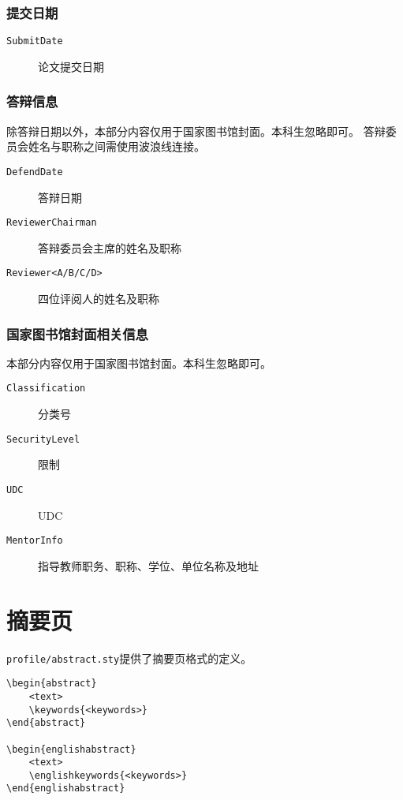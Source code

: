 \subsubsection{提交日期}
\begin{description}
    \item[\texttt{SubmitDate}] 论文提交日期
\end{description}

\subsubsection{答辩信息}

除答辩日期以外，本部分内容仅用于国家图书馆封面。本科生忽略即可。
答辩委员会姓名与职称之间需使用波浪线连接。

\begin{description}
    \item[\texttt{DefendDate}] 答辩日期
    \item[\texttt{ReviewerChairman}] 答辩委员会主席的姓名及职称 
    \item[\texttt{Reviewer<A/B/C/D>}] 四位评阅人的姓名及职称  
\end{description}

\subsubsection{国家图书馆封面相关信息}

本部分内容仅用于国家图书馆封面。本科生忽略即可。

\begin{description}
    \item[\texttt{Classification}] 分类号
    \item[\texttt{SecurityLevel}] 限制  
    \item[\texttt{UDC}] UDC
    \item[\texttt{MentorInfo}] 指导教师职务、职称、学位、单位名称及地址
\end{description}

\section{摘要页}

\texttt{profile/abstract.sty}提供了摘要页格式的定义。

\begin{lstlisting}
\begin{abstract}
    <text>
    \keywords{<keywords>}
\end{abstract}

\begin{englishabstract}
    <text>
    \englishkeywords{<keywords>}
\end{englishabstract}
\end{lstlisting}

